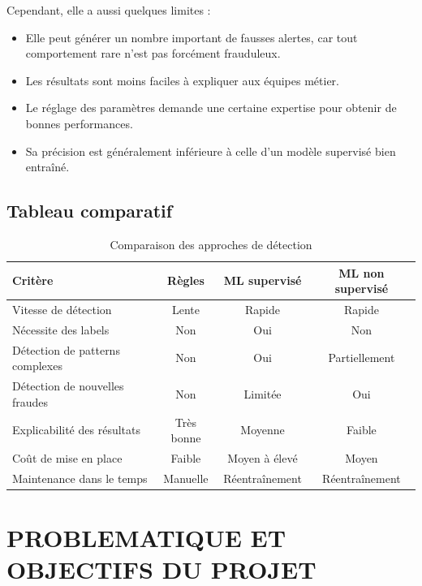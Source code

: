 \documentclass[12pt, oneside, a4paper]{report}
\begin{document}
Cependant, elle a aussi quelques limites :
\begin{itemize}
\item Elle peut générer un nombre important de fausses alertes, car tout comportement rare n'est pas forcément frauduleux.
\item Les résultats sont moins faciles à expliquer aux équipes métier.
\item Le réglage des paramètres demande une certaine expertise pour obtenir de bonnes performances.
\item Sa précision est généralement inférieure à celle d'un modèle supervisé bien entraîné.
\end{itemize}

\subsection{Tableau comparatif}
\begin{table}[h!]
\centering
\caption{Comparaison des approches de détection}
\label{tab:comparaison-approches}
\vspace{0.3cm}
\renewcommand{\arraystretch}{1.3}
\vspace{0.3cm}
\begin{tabular}{|l|c|c|c|}
\hline
\textbf{Critère} & \textbf{Règles} & \textbf{ML supervisé} & \textbf{ML non supervisé} \\
\hline
Vitesse de détection & Lente & Rapide & Rapide \\
\hline
Nécessite des labels & Non & Oui & Non \\
\hline
Détection de patterns complexes & Non & Oui & Partiellement \\
\hline
Détection de nouvelles fraudes & Non & Limitée & Oui \\
\hline
Explicabilité des résultats & Très bonne & Moyenne & Faible \\
\hline
Coût de mise en place & Faible & Moyen à élevé & Moyen \\
\hline
Maintenance dans le temps & Manuelle & Réentraînement & Réentraînement \\
\hline
\end{tabular}
\end{table}


\section{PROBLEMATIQUE ET OBJECTIFS DU PROJET}
\end{document}
